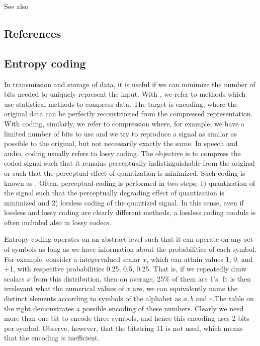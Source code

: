 \documentclass[letterpaper,10pt,english]{jupyterBook}
\begin{document}
\sphinxAtStartPar
See also 


\subsection{References}
\label{\detokenize{Transmission/Modified_discrete_cosine_transform_MDCT:references}}
\sphinxstepscope


\subsection{Entropy coding}
\label{\detokenize{Transmission/Entropy_coding:entropy-coding}}\label{\detokenize{Transmission/Entropy_coding::doc}}
\sphinxAtStartPar
In transmission and storage of data, it is useful if we can minimize the
number of bits needed to uniquely represent the input. With , we refer to methods which use statistical methods to compress
data. The target is  encoding, where the original data can be
perfectly reconstructed from the compressed representation. With 
coding, similarly, we refer to compression where, for example, we have a
limited number of bits to use and we try to reproduce a signal as
similar as possible to the original, but not necessarily exactly the
same. In speech and audio, coding usually refers to lossy coding. The
objective is to compress the coded signal such that it remains
perceptually indistinguishable from the original or such that the
perceptual effect of quantization is minimized. Such coding is known as
.
Often, perceptual coding is performed in two steps; 1) quantization of
the signal such that the perceptually degrading effect of quantization
is minimized and 2) lossless coding of the quantized signal. In this
sense, even if lossless and lossy coding are clearly different methods,
a lossless coding module is often included also in lossy codecs.

\sphinxAtStartPar
Entropy coding operates on an abstract level such that it can operate on
any set of symbols as long as we have information about the
probabilities of each symbol. For example, consider a integer\sphinxhyphen{}valued
scalar \(x\), which can attain values \sphinxhyphen{}1, 0, and +1, with respecitve
probabilities 0.25, 0.5, 0.25. That is, if we repeatedly draw scalars
\(x\) from this distribution, then on average, 25\% of them are \sphinxhyphen{}1’s. It is
then irrelevant what the numerical values of \(x\) are, we can
equivalently name the distinct elements according to symbols of the
alphabet as \(a, b\) and \(c\).The table on the right demonstrates a possible encoding of these
numbers. Clearly we need more than one bit to encode three symbols, and
hence this encoding uses 2 bits per symbol. Observe, however, that the
bit\sphinxhyphen{}string 11 is not used, which means that the encoding is inefficient.
\end{document}
